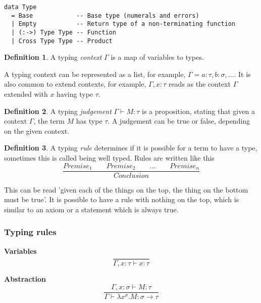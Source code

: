 \documentclass[12pt,a4paper]{report}
\theoremstyle{definition}
\newtheorem{definition}{Definition}[chapter]%
\theoremstyle{remark}
\begin{document}
\begin{listing}
\caption{SPCF inductive definition for types using an ADT}
\begin{verbatim}
data Type
  = Base            -- Base type (numerals and errors)
  | Empty           -- Return type of a non-terminating function
  | (:->) Type Type -- Function
  | Cross Type Type -- Product
\end{verbatim}
\label{listing:type-adt}
\end{listing}

\begin{definition}
    A typing \emph{context} $\Gamma$ is a map of variables to types.
\end{definition}

A typing context can be represented as a list, for example, $\Gamma = a:\tau, b:\sigma, \ldots$. It is also common to extend contexts, for example, $\Gamma, x:\tau$ reads as the context $\Gamma$ extended with $x$ having type $\tau$. 

\begin{definition}
    A typing \emph{judgement} $\Gamma \vdash M:\tau$ is a proposition, stating that given a context $\Gamma$, the term $M$ has type $\tau$. A judgement can be true or false, depending on the given context.
\end{definition}

\begin{definition}
    A typing \emph{rule} determines if it is possible for a term to have a type, sometimes this is called being well typed. Rules are written like this
    \[
    \frac{Premise_1 \quad\quad Premise_2 \quad\quad \ldots \quad\quad Premise_n}{Conclusion}
    \]

    This can be read 'given each of the things on the top, the thing on the bottom must be true'. It is possible to have a rule with nothing on the top, which is similar to an axiom or a statement which is always true.
\end{definition}

\subsubsection{Typing rules} \label{section: type rules}

\textbf{Variables}
\begin{equation}
    \frac{}{\Gamma, x:\tau \vdash x: \tau}
\end{equation}

\textbf{Abstraction}
\begin{equation}
    \frac{\Gamma, x:\sigma \vdash M : \tau}{\Gamma \vdash \lambda x^{\sigma}. M : \sigma \rightarrow \tau}
\end{equation}
\end{document}
